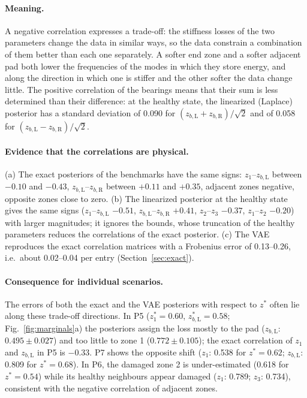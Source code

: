 \documentclass[11pt]{article}
\newcommand{\zb}[1]{z_{b,\mathrm{#1}}}
\begin{document}
\paragraph{Meaning.} A negative correlation expresses a trade-off: the stiffness losses of the two parameters change
the data in similar ways, so the data constrain a combination of them better than each one separately. A softer end
zone and a softer adjacent pad both lower the frequencies of the modes in which they store energy, and along the
direction in which one is stiffer and the other softer the data change little. The positive correlation of the
bearings means that their sum is less determined than their difference: at the healthy state, the linearized
(Laplace) posterior has a standard deviation of 0.090 for $(\zb{L}+\zb{R})/\sqrt2$ and of 0.058 for
$(\zb{L}-\zb{R})/\sqrt2$.

\paragraph{Evidence that the correlations are physical.} (a) The exact posteriors of the benchmarks have the same
signs: $z_1$--$\zb{L}$ between $-0.10$ and $-0.43$, $\zb{L}$--$\zb{R}$ between $+0.11$ and $+0.35$, adjacent zones
negative, opposite zones close to zero. (b) The linearized posterior at the healthy state gives the same signs
($z_1$--$\zb{L}$ $-0.51$, $\zb{L}$--$\zb{R}$ $+0.41$, $z_2$--$z_3$ $-0.37$, $z_1$--$z_2$ $-0.20$) with larger
magnitudes; it ignores the bounds, whose truncation of the healthy parameters reduces the correlations of the exact
posterior. (c) The VAE reproduces the exact correlation matrices with a Frobenius error of 0.13--0.26, i.e.\ about
0.02--0.04 per entry (Section~\ref{sec:exact}).

\paragraph{Consequence for individual scenarios.} The errors of both the exact and the VAE posteriors with respect to
$z^*$ often lie along these trade-off directions. In P5 ($z_1^*=0.60$, $\zb{L}^*=0.58$; Fig.~\ref{fig:marginals}a)
the posteriors assign the loss mostly to the pad ($\zb{L}$: $0.495\pm0.027$) and too little to zone 1
($0.772\pm0.105$); the exact correlation of $z_1$ and $\zb{L}$ in P5 is $-0.33$. P7 shows the opposite shift
($z_1$: 0.538 for $z^*=0.62$; $\zb{L}$: 0.809 for $z^*=0.68$). In P6, the damaged zone 2 is under-estimated (0.618
for $z^*=0.54$) while its healthy neighbours appear damaged ($z_1$: 0.789; $z_3$: 0.734), consistent with the negative
correlation of adjacent zones.
\end{document}
